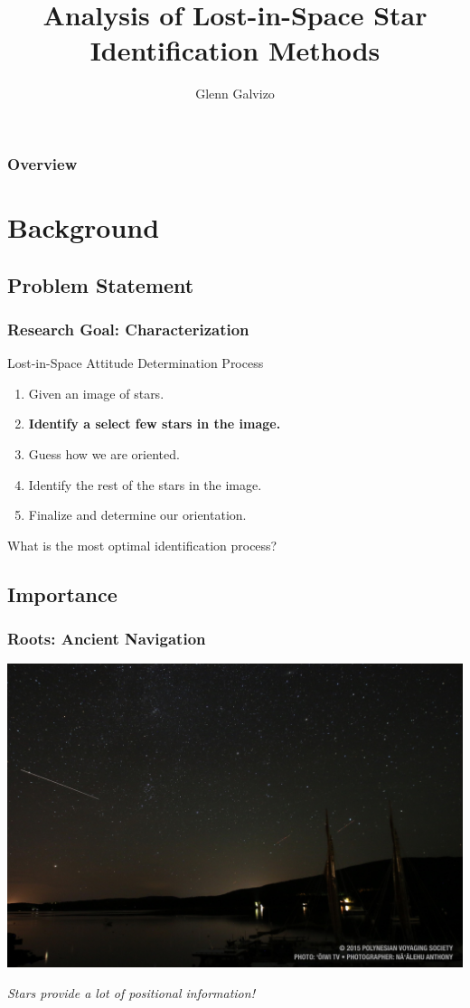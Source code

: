 \documentclass[11pt]{beamer}
\author{Glenn Galvizo}
\title{Analysis of Lost-in-Space Star Identification Methods}
\institute{University of Hawaii at Manoa - Advisor: Dr. Lipyeow Lim}
\begin{document}
    \begin{frame}
        \titlepage
    \end{frame}

    \begin{frame}
        \frametitle{Overview}
        \tableofcontents
    \end{frame}

    \section{Background}\label{sec:background}
    \subsection{Problem Statement}\label{subsec:problemStatement}
    \begin{frame}
        \frametitle{Research Goal: Characterization}
        \begin{block}{Lost-in-Space Attitude Determination Process}
            \begin{enumerate}
                \item Given an image of stars. \medskip
                \item \textbf{Identify a select few stars in the image.} \medskip
                \item Guess how we are oriented. \medskip
                \item Identify the rest of the stars in the image. \medskip
                \item Finalize and determine our orientation. \medskip
            \end{enumerate}
        \end{block} \bigskip
        What is the most optimal identification process?
    \end{frame}

    \subsection{Importance}\label{subsec:importance}
    \begin{frame}
        \frametitle{Roots: Ancient Navigation}
        \centerline{\includegraphics[scale=0.16]{images/hokulea}}
        \centerline{\textit{Stars provide a lot of positional information!}}
    \end{frame}
\end{document}
